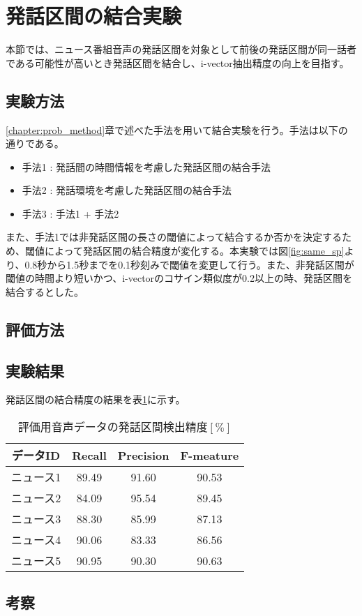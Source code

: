 \section{発話区間の結合実験}
本節では、ニュース番組音声の発話区間を対象として前後の発話区間が同一話者である可能性が高いとき発話区間を結合し、i-vector抽出精度の向上を目指す。
\subsection{実験方法}
\ref{chapter:prob_method}章で述べた手法を用いて結合実験を行う。手法は以下の通りである。

\begin{itemize}
\item 手法1 : 発話間の時間情報を考慮した発話区間の結合手法
\item 手法2 : 発話環境を考慮した発話区間の結合手法
\item 手法3 : 手法1 + 手法2
\end{itemize}\par\par

また、手法1では非発話区間の長さの閾値によって結合するか否かを決定するため、閾値によって発話区間の結合精度が変化する。本実験では図\ref{fig:same_sp}より、0.8秒から1.5秒までを0.1秒刻みで閾値を変更して行う。また、非発話区間が閾値の時間より短いかつ、i-vectorのコサイン類似度が0.2以上の時、発話区間を結合するとした。

\subsection{評価方法}


\subsection{実験結果}
発話区間の結合精度の結果を表\ref{table:result_connect}に示す。

\begin{table}[htb]
  \begin{center}
    \caption{評価用音声データの発話区間検出精度$[\%]$ \label{table:result_connect}}
    \begin{tabular}{|c||c|c|c|} \hline
      データID & Recall & Precision & F-meature \\ \hline
      ニュース1 & 89.49 & 91.60 & 90.53 \\ \hline
      ニュース2 & 84.09 & 95.54 & 89.45\\ \hline
      ニュース3 & 88.30 & 85.99 & 87.13 \\ \hline
      ニュース4 & 90.06 & 83.33 & 86.56\\ \hline
      ニュース5 & 90.95 & 90.30 & 90.63\\ \hline
    \end{tabular}
  \end{center} 
\end{table}



\subsection{考察}
